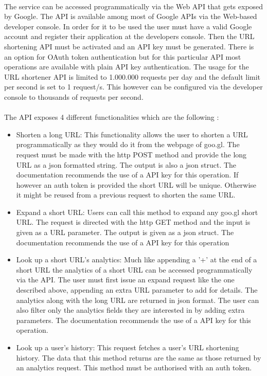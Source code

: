 \documentclass[12pt]{article}
\begin{document}
\paragraph{}
The service can be accessed programmatically via the Web API that gets exposed by Google. The API is available among most of Google APIs via the Web-based developer console. In order for it to be used the user must have a valid Google account and register their application at the developers console. Then the URL shortening API must be activated and an API key must be generated. There is an option for OAuth token authentication but for this particular API most operations are available with plain API key authentication. The usage for the URL shortener API is limited to 1.000.000 requests per day and the default limit per second is set to 1 request/s. This however can be configured via the developer console to thousands of requests per second. 

\paragraph{}
The API exposes 4 different functionalities which are the following \cite{google}: 

\begin{itemize}

\item {Shorten a long URL:  This functionality allows the user to shorten a URL programmatically as they would do it from the webpage of goo.gl. The request must be made with the http POST method and provide the long URL as a json formatted string. The output is also a json struct. The documentation recommends the use of a API key for this operation. If however an auth token is provided the short URL will be unique. Otherwise it might be reused from a previous request to shorten the same URL.}
\item {Expand a short URL: Users can call this method to expand any goo.gl short URL. The request is directed with the http GET method and the input is given as a URL parameter.  The output is given as a json struct. The documentation recommends the use of a API key for this operation}
\item {Look up a short URL's analytics: Much like appending a '+' at the end of a short URL the analytics of a short URL can be accessed programmatically via the API. The user must first issue an expand request like the one described above, appending an extra URL parameter to add for details. The analytics along with the long URL are returned in json format. The user can also filter only the analytics fields they are interested in by adding extra parameters. The documentation recommends the use of a API key for this operation.}
\item{Look up a user's history: This request fetches a user's URL shortening history. The data that this method returns are the same as those returned by an analytics request. This method must be authorised with an auth token.  }
\end{itemize}
\end{document}
